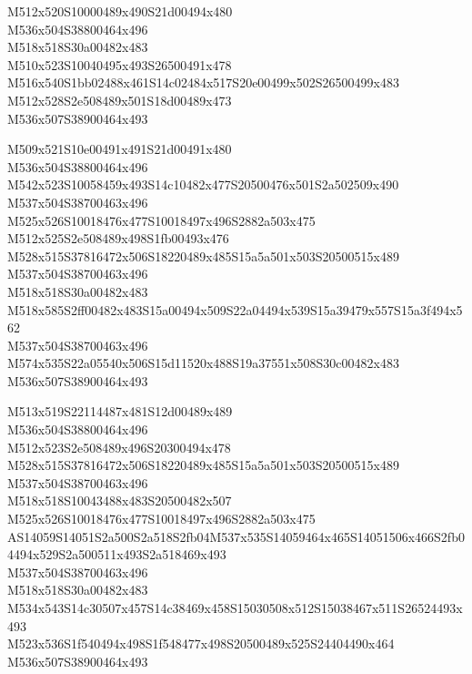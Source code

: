 \documentclass{article}
\begin{document}
\begin{multicols}{5}
\begin{center}

M512x520S10000489x490S21d00494x480 %
\\M536x504S38800464x496 %
\\M518x518S30a00482x483 %
\\M510x523S10040495x493S26500491x478 %
\\M516x540S1bb02488x461S14c02484x517S20e00499x502S26500499x483 %
\\M512x528S2e508489x501S18d00489x473 %
\\M536x507S38900464x493 %
\vfil
\columnbreak

M509x521S10e00491x491S21d00491x480 %
\\M536x504S38800464x496 %
\\M542x523S10058459x493S14c10482x477S20500476x501S2a502509x490 %
\\M537x504S38700463x496 %
\\M525x526S10018476x477S10018497x496S2882a503x475 %
\\M512x525S2e508489x498S1fb00493x476 %
\\M528x515S37816472x506S18220489x485S15a5a501x503S20500515x489 %
\\M537x504S38700463x496 %
\\M518x518S30a00482x483 %
\\M518x585S2ff00482x483S15a00494x509S22a04494x539S15a39479x557S15a3f494x562 %
\\M537x504S38700463x496 %
\\M574x535S22a05540x506S15d11520x488S19a37551x508S30c00482x483 %
\\M536x507S38900464x493 %
\vfil
\columnbreak

M513x519S22114487x481S12d00489x489 %
\\M536x504S38800464x496 %
\\M512x523S2e508489x496S20300494x478 %
\\M528x515S37816472x506S18220489x485S15a5a501x503S20500515x489 %
\\M537x504S38700463x496 %
\\M518x518S10043488x483S20500482x507 %
\\M525x526S10018476x477S10018497x496S2882a503x475 %
\\AS14059S14051S2a500S2a518S2fb04M537x535S14059464x465S14051506x466S2fb04494x529S2a500511x493S2a518469x493
\\M537x504S38700463x496 %
\\M518x518S30a00482x483 %
\\M534x543S14c30507x457S14c38469x458S15030508x512S15038467x511S26524493x493 %
\\M523x536S1f540494x498S1f548477x498S20500489x525S24404490x464 %
\\M536x507S38900464x493 %
\vfil
\columnbreak


\end{center}
\end{multicols}
\end{document}
